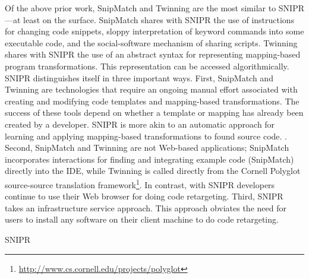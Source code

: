 Of the above prior work, SnipMatch and Twinning are the most similar to \uppercase{SnipR}---at least on the surface. SnipMatch shares with \uppercase{SnipR} the use of instructions for changing code snippets, sloppy interpretation of keyword commands into some executable code, and the social-software mechanism of sharing scripts. Twinning shares with \uppercase{SnipR} the use of an abstract syntax for representing mapping-based program transformations. This representation can be accessed algorithmically. \uppercase{SnipR} distinguishes itself in three important ways. First, SnipMatch and Twinning are technologies that require an ongoing manual effort associated with creating and modifying code templates and mapping-based transformations. The success of these tools depend on whether a template or mapping has already been created by a developer. \uppercase{SnipR} is more akin to an automatic approach for learning and applying mapping-based transformations to found source code. . Second, SnipMatch and Twinning are not Web-based applications; SnipMatch incorporates interactions for finding and integrating example code (SnipMatch) directly into the IDE, while Twinning is called directly from the Cornell Polyglot source-source translation framework\footnote{\url{http://www.cs.cornell.edu/projects/polyglot}}. In contrast, with \uppercase{SnipR} developers continue to use their Web browser for doing code retargeting. Third, \uppercase{SnipR} takes an infrastructure service approach. This approach obviates the need for users to install any software on their client machine to do code retargeting.     

\uppercase{SnipR} 






